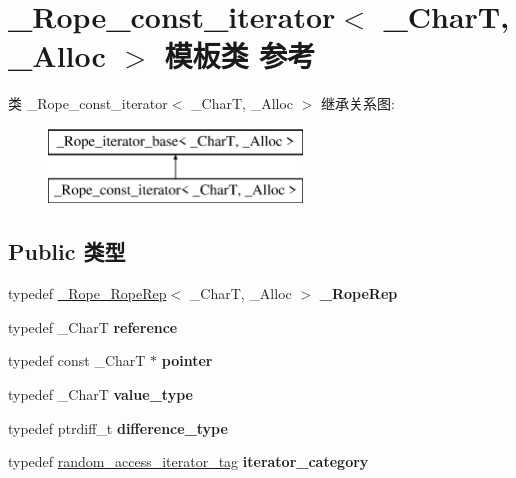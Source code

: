 \hypertarget{class___rope__const__iterator}{}\section{\+\_\+\+Rope\+\_\+const\+\_\+iterator$<$ \+\_\+\+CharT, \+\_\+\+Alloc $>$ 模板类 参考}
\label{class___rope__const__iterator}
类 \+\_\+\+Rope\+\_\+const\+\_\+iterator$<$ \+\_\+\+CharT, \+\_\+\+Alloc $>$ 继承关系图\+:\begin{figure}[H]
\begin{center}
\leavevmode
\includegraphics[height=2.000000cm]{class___rope__const__iterator}
\end{center}
\end{figure}
\subsection*{Public 类型}
\begin{DoxyCompactItemize}
\item 
\mbox{\label{class___rope__const__iterator_a06d60e0f9ffa4f88df9a840b88a9a170}} 
typedef \hyperlink{struct___rope___rope_rep}{\+\_\+\+Rope\+\_\+\+Rope\+Rep}$<$ \+\_\+\+CharT, \+\_\+\+Alloc $>$ {\bfseries \+\_\+\+Rope\+Rep}
\item 
\mbox{\label{class___rope__const__iterator_aeea3c7ca66c873556996c4ba81517838}} 
typedef \+\_\+\+CharT {\bfseries reference}
\item 
\mbox{\label{class___rope__const__iterator_a4040671083aac912715101ac50e25536}} 
typedef const \+\_\+\+CharT $\ast$ {\bfseries pointer}
\item 
\mbox{\label{class___rope__const__iterator_a30e3660b9d72e9932b13b723cb2d0fcc}} 
typedef \+\_\+\+CharT {\bfseries value\+\_\+type}
\item 
\mbox{\label{class___rope__const__iterator_ac390206bee2d3092ea5b07d7fca31268}} 
typedef ptrdiff\+\_\+t {\bfseries difference\+\_\+type}
\item 
\mbox{\label{class___rope__const__iterator_abaef2d88270c37445f4c9a8da2b95afa}} 
typedef \hyperlink{structrandom__access__iterator__tag}{random\+\_\+access\+\_\+iterator\+\_\+tag} {\bfseries iterator\+\_\+category}
\end{DoxyCompactItemize}
